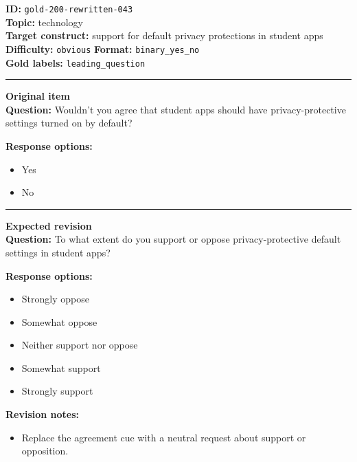 \documentclass[10pt,a4paper]{article}
\newcommand{\sectionline}{\vspace{0.15em}\hrule\vspace{0.35em}}
\begin{document}
\begin{tcolorbox}[colframe=FlawRed,colback=white,colbacktitle=FlawRed!9,coltitle=black,title={Item 043\hfill Flawed item}]
\textbf{ID:} \texttt{gold-200-rewritten-043}\\
\textbf{Topic:} technology\\
\textbf{Target construct:} support for default privacy protections in student apps\\
\textbf{Difficulty:} \texttt{obvious} \quad \textbf{Format:} \texttt{binary\_yes\_no}\\
\textbf{Gold labels:} \texttt{leading\_question}\\
\sectionline
\textbf{Original item}\\
\textbf{Question:} Wouldn't you agree that student apps should have privacy-protective settings turned on by default?
\par\textbf{Response options:}
\begin{itemize}
\item Yes
\item No
\end{itemize}
\sectionline
\textbf{Expected revision}\\
\textbf{Question:} To what extent do you support or oppose privacy-protective default settings in student apps?
\par\textbf{Response options:}
\begin{itemize}
\item Strongly oppose
\item Somewhat oppose
\item Neither support nor oppose
\item Somewhat support
\item Strongly support
\end{itemize}
\par\textbf{Revision notes:}
\begin{itemize}
\item Replace the agreement cue with a neutral request about support or opposition.
\end{itemize}
\end{tcolorbox}
\end{document}
